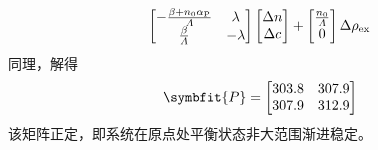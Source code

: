 \begin{exercise}
\begin{enumerate}
\begin{equation*}
\begin{bmatrix}
                -\frac{\beta+n_0 \alpha_{\rm P}}{\varLambda} & \lambda \\
                \frac{\beta}{\varLambda} & -\lambda
            \end{bmatrix} \begin{bmatrix}
                \Delta n \\
                \Delta c
            \end{bmatrix} + \begin{bmatrix}
                \frac{n_0}{\varLambda} \\
                0
            \end{bmatrix} \Delta \rho_{\rm ex} 
        \end{equation*}
        同理，解得
        \begin{equation*}
            \symbfit{P} = \begin{bmatrix}
                303.8 & 307.9 \\
                307.9 & 312.9
            \end{bmatrix}
        \end{equation*}
        该矩阵正定，即系统在原点处平衡状态非大范围渐进稳定。
    \end{enumerate}
\end{exercise}
